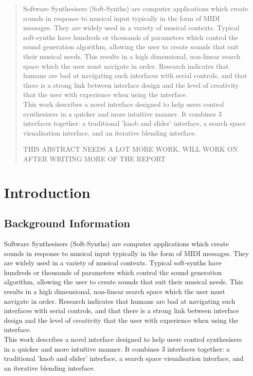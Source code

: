 \documentclass[11pt, oneside]{report}   	%
\begin{document}
\begin{abstract}
\begin{flushleft}
Software Synthesisers (Soft-Synths) are computer applications which create sounds in response to musical input typically in the form of MIDI messages. They are widely used in a variety of musical contexts. Typical soft-synths have hundreds or thousands of parameters which control the sound generation algorithm, allowing the user to create sounds that suit their musical needs. This results in a high dimensional, non-linear search space which the user must navigate in order. Research indicates that humans are bad at navigating such interfaces with serial controls, and that there is a strong link between interface design and the level of creativity that the user with experience when using the interface. \\
This work describes a novel interface designed to help users control synthesisers in a quicker and more intuitive manner. It combines 3 interfaces together: a traditional 'knob and slider' interface, a search space visualisation interface, and an iterative blending interface.

THIS ABSTRACT NEEDS A LOT MORE WORK, WILL WORK ON AFTER WRITING MORE OF THE REPORT
\end{flushleft}
\end{abstract}


\tableofcontents
\clearpage
\setcounter{page}{1}


\chapter{Introduction}
\section{Background Information}
Software Synthesisers (Soft-Synths) are computer applications which create sounds in response to musical input typically in the form of MIDI messages. They are widely used in a variety of musical contexts. Typical soft-synths have hundreds or thousands of parameters which control the sound generation algorithm, allowing the user to create sounds that suit their musical needs. This results in a high dimensional, non-linear search space which the user must navigate in order. Research indicates that humans are bad at navigating such interfaces with serial controls, and that there is a strong link between interface design and the level of creativity that the user with experience when using the interface. \\
This work describes a novel interface designed to help users control synthesisers in a quicker and more intuitive manner. It combines 3 interfaces together: a traditional 'knob and slider' interface, a search space visualisation interface, and an iterative blending interface.
\end{document}
